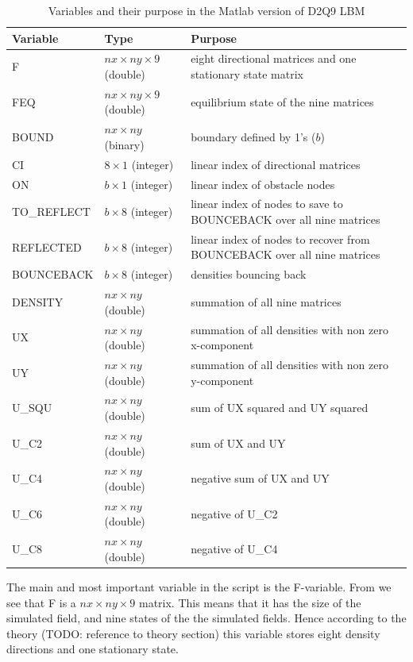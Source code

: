 \begin{table}[htb]
	\centering
	\begin{tabular}{llp{6cm}}
		\toprule
		Variable & Type & Purpose \\
		\midrule
		F 				& $nx\times ny\times 9$ (double)	& eight directional matrices and one stationary state matrix\\
		FEQ 			& $nx\times ny\times 9$ (double)	& equilibrium state of the nine matrices\\

		BOUND 			& $nx\times ny$ (binary) 		& boundary defined by 1's ($b$)\\
		CI				& $8\times 1$ (integer) 			& linear index of directional matrices\\
		ON				& $b\times 1$ (integer)			& linear index of obstacle nodes\\
		TO\_REFLECT 		& $b\times 8$ (integer)			& linear index of nodes to save to BOUNCEBACK over all nine matrices\\
		REFLECTED 		& $b\times 8$ (integer) 			& linear index of nodes to recover from BOUNCEBACK over all nine matrices \\
		BOUNCEBACK		& $b\times 8$ (integer) 			& densities bouncing back\\
		DENSITY			& $nx\times ny$ (double) 		& summation of all nine matrices\\
		UX				& $nx\times ny$ (double) 		& summation of all densities with non zero x-component\\
		UY				& $nx\times ny$ (double) 		& summation of all densities with non zero y-component \\
		U\_SQU			& $nx\times ny$ (double) 		& sum of UX squared and UY squared\\
		U\_C2			& $nx\times ny$ (double) 		& sum of UX and UY\\
		U\_C4			& $nx\times ny$ (double) 		& negative sum of UX and UY\\
		U\_C6			& $nx\times ny$ (double) 		& negative of U\_C2\\
		U\_C8			& $nx\times ny$ (double) 		& negative of U\_C4\\
		\bottomrule
	\end{tabular}
	\caption{Variables and their purpose in the Matlab version of D2Q9 LBM}
	\label{matlabvars}
\end{table}

The main and most important variable in the script is the F-variable. From  we see that F is a $nx\times ny\times 9$ matrix. This means that it has the size of the simulated field, and nine states of the the simulated fields. Hence according to the theory (TODO: reference to theory section) this variable stores eight density directions and one stationary state. 


